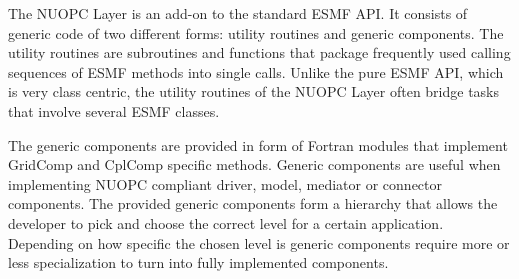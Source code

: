 %
The NUOPC Layer is an add-on to the standard ESMF API. It consists of generic code of two different forms: utility routines and generic components. The utility routines are subroutines and functions that package frequently used calling sequences of ESMF methods into single calls. Unlike the pure ESMF API, which is very class centric, the utility routines of the NUOPC Layer often bridge tasks that involve several ESMF classes.

The generic components are provided in form of Fortran modules that implement GridComp and CplComp specific methods. Generic components are useful when implementing NUOPC compliant driver, model, mediator or connector components. The provided generic components form a hierarchy that allows the developer to pick and choose the correct level for a certain application. Depending on how specific the chosen level is generic components require more or less specialization to turn into fully implemented components.
